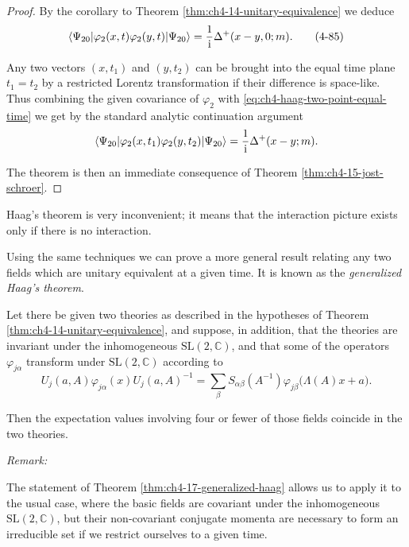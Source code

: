 \begin{proof}
By the corollary to Theorem \ref{thm:ch4-14-unitary-equivalence} we deduce
\begin{equation}
  \langle \Psi_{20}\rvert\varphi_2(x,t)\varphi_2(y,t)\lvert \Psi_{20}\rangle
  =\frac{1}{\mathrm{i}}\Delta^+(x-y,0;m).
  \tag{4-85}\label{eq:ch4-haag-two-point-equal-time}
\end{equation}

Any two vectors $(x,t_1)$ and $(y,t_2)$ can be brought into the equal time
plane $t_1=t_2$ by a restricted Lorentz transformation if their difference is
space-like.  Thus combining the given covariance of $\varphi_2$ with \eqref{eq:ch4-haag-two-point-equal-time}
we get by the standard analytic continuation argument
\begin{equation*}
  \langle \Psi_{20}\rvert\varphi_2(x,t_1)\varphi_2(y,t_2)\lvert \Psi_{20}\rangle
  =\frac{1}{\mathrm{i}}\Delta^+(x-y;m).
\end{equation*}

The theorem is then an immediate consequence of Theorem \ref{thm:ch4-15-jost-schroer}.
\end{proof}

Haag's theorem is very inconvenient; it means that the interaction picture
exists only if there is no interaction.

Using the same techniques we can prove a more general result relating any two
fields which are unitary equivalent at a given time.  It is known as the
\emph{generalized Haag's theorem}.

\begin{theorem}[4-17]\label{thm:ch4-17-generalized-haag}
Let there be given two theories as described in the hypotheses of Theorem
\ref{thm:ch4-14-unitary-equivalence}, and suppose, in addition, that the theories are invariant under the
inhomogeneous $\mathrm{SL}(2,\mathbb C)$, and that some of the operators
$\varphi_{j\alpha}$ transform under $\mathrm{SL}(2,\mathbb C)$ according to
\begin{equation}
  U_j(a,A)\varphi_{j\alpha}(x)U_j(a,A)^{-1}
  =\sum_\beta S_{\alpha\beta}(A^{-1})
   \varphi_{j\beta}\bigl(\Lambda(A)x+a\bigr).
  \tag{4-86}\label{eq:ch4-generalized-haag-covariance}
\end{equation}

Then the expectation values involving four or fewer of those fields coincide
in the two theories.
\end{theorem}

\emph{Remark:}

The statement of Theorem \ref{thm:ch4-17-generalized-haag} allows us to apply it to the usual case, where
the basic fields are covariant under the inhomogeneous $\mathrm{SL}(2,\mathbb
C)$, but their non-covariant conjugate momenta are necessary to form an
irreducible set if we restrict ourselves to a given time.

